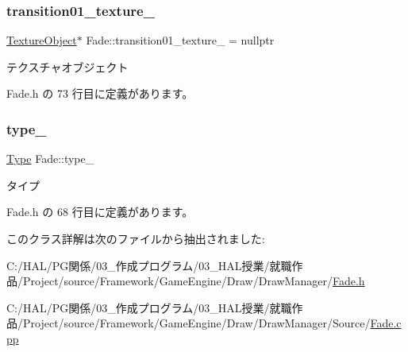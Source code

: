 \subsubsection{\texorpdfstring{transition01\+\_\+texture\+\_\+}{transition01\_texture\_}}
{\footnotesize\ttfamily \mbox{\hyperlink{class_texture_object}{Texture\+Object}}$\ast$ Fade\+::transition01\+\_\+texture\+\_\+ = nullptr\hspace{0.3cm}{\ttfamily [private]}}



テクスチャオブジェクト 



 Fade.\+h の 73 行目に定義があります。

\mbox{\label{class_fade_a1d04a65762c863a1d3571f0e1d47532a}} 
\subsubsection{\texorpdfstring{type\+\_\+}{type\_}}
{\footnotesize\ttfamily \mbox{\hyperlink{class_fade_ac06f27215b454aa05b93c236476d6e80}{Type}} Fade\+::type\+\_\+\hspace{0.3cm}{\ttfamily [private]}}



タイプ 



 Fade.\+h の 68 行目に定義があります。



このクラス詳解は次のファイルから抽出されました\+:\begin{DoxyCompactItemize}
\item 
C\+:/\+H\+A\+L/\+P\+G関係/03\+\_\+作成プログラム/03\+\_\+\+H\+A\+L授業/就職作品/\+Project/source/\+Framework/\+Game\+Engine/\+Draw/\+Draw\+Manager/\mbox{\hyperlink{_fade_8h}{Fade.\+h}}\item 
C\+:/\+H\+A\+L/\+P\+G関係/03\+\_\+作成プログラム/03\+\_\+\+H\+A\+L授業/就職作品/\+Project/source/\+Framework/\+Game\+Engine/\+Draw/\+Draw\+Manager/\+Source/\mbox{\hyperlink{_fade_8cpp}{Fade.\+cpp}}\end{DoxyCompactItemize}
